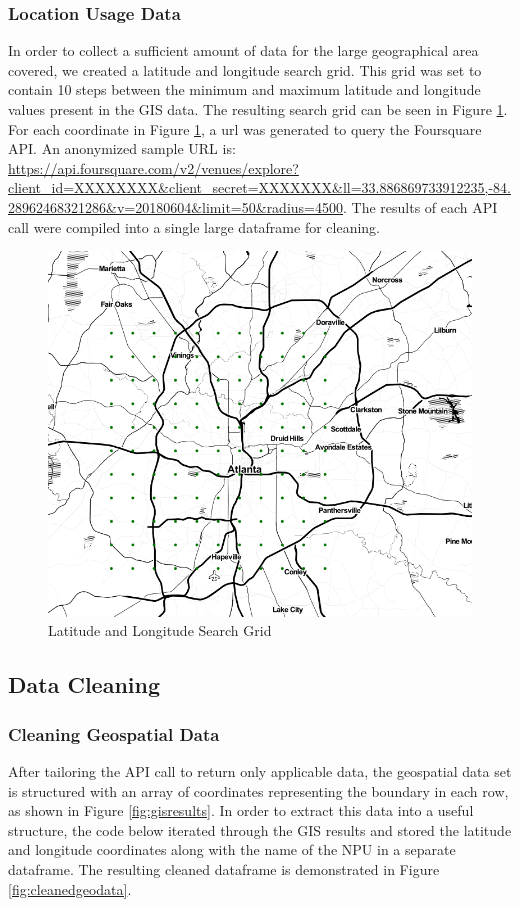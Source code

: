 \documentclass[11pt]{amsart}
\begin{document}
\subsubsection{Location Usage Data}
In order to collect a sufficient amount of data for the large geographical area covered, we created a latitude and longitude search grid. This grid was set to contain 10 steps between the minimum and maximum latitude and longitude values present in the GIS data. The resulting search grid can be seen in Figure \ref{fig:gridmap}. For each coordinate in Figure \ref{fig:gridmap}, a url was generated to query the Foursquare API. An anonymized sample URL is: \url{https://api.foursquare.com/v2/venues/explore?client_id=XXXXXXXX&client_secret=XXXXXXX&ll=33.886869733912235,-84.28962468321286&v=20180604&limit=50&radius=4500}.
The results of each API call were compiled into a single large dataframe for cleaning.
\begin{figure}
\includegraphics[width=\textwidth]{gridmap}
\caption{Latitude and Longitude Search Grid}
\label{fig:gridmap}
\end{figure}
\FloatBarrier
\subsection{Data Cleaning}
\subsubsection{Cleaning Geospatial Data}
After tailoring the API call to return only applicable data, the geospatial data set is structured with an array of coordinates representing the boundary in each row, as shown in Figure \ref{fig:gisresults}. In order to extract this data into a useful structure, the code below iterated through the GIS results and stored the latitude and longitude coordinates along with the name of the NPU in a separate dataframe. The resulting cleaned dataframe is demonstrated in Figure \ref{fig:cleanedgeodata}. 
\end{document}
